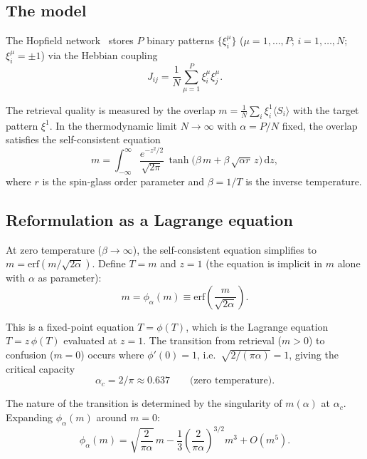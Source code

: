 \documentclass[11pt,a4paper]{article}
\theoremstyle{definition}
\newcommand{\dd}{\mathrm{d}}
\begin{document}
\subsection{The model}

The Hopfield network~\cite{hopfield1982} stores $P$ binary patterns
$\{\xi^{\mu}_i\}$ ($\mu = 1, \ldots, P$; $i = 1, \ldots, N$;
$\xi^{\mu}_i = \pm 1$) via the Hebbian coupling
\begin{equation}
J_{ij} = \frac{1}{N} \sum_{\mu=1}^{P} \xi^{\mu}_i \xi^{\mu}_j.
\end{equation}

The retrieval quality is measured by the overlap $m = \frac{1}{N}
\sum_i \xi^{1}_i \langle S_i \rangle$ with the target pattern $\xi^1$.
In the thermodynamic limit $N \to \infty$ with $\alpha = P/N$ fixed,
the overlap satisfies the self-consistent equation~\cite{amit1985}
\begin{equation}
m = \int_{-\infty}^{\infty} \frac{e^{-z^2/2}}{\sqrt{2\pi}}\,
\tanh\bigl(\beta\,m + \beta\,\sqrt{\alpha r}\,z\bigr)\,\dd z,
\label{eq:hopfield_sc}
\end{equation}
where $r$ is the spin-glass order parameter and $\beta = 1/T$ is the
inverse temperature.

\subsection{Reformulation as a Lagrange equation}

At zero temperature ($\beta \to \infty$), the self-consistent equation
simplifies to $m = \text{erf}(m / \sqrt{2\alpha})$. Define
$T = m$ and $z = 1$ (the equation is implicit in $m$ alone with
$\alpha$ as parameter):
\begin{equation}
m = \phi_\alpha(m) \equiv \text{erf}\!\left(\frac{m}{\sqrt{2\alpha}}\right).
\end{equation}

This is a fixed-point equation $T = \phi(T)$, which is the Lagrange
equation $T = z\,\phi(T)$ evaluated at $z = 1$. The transition from
retrieval ($m > 0$) to confusion ($m = 0$) occurs where $\phi'(0) = 1$,
i.e.\ $\sqrt{2/(\pi\alpha)} = 1$, giving the critical capacity
\begin{equation}
\alpha_c = 2/\pi \approx 0.637 \qquad \text{(zero temperature)}.
\end{equation}

The nature of the transition is determined by the singularity of
$m(\alpha)$ at $\alpha_c$. Expanding $\phi_\alpha(m)$ around $m = 0$:
\begin{equation}
\phi_\alpha(m) = \sqrt{\frac{2}{\pi\alpha}}\,m
- \frac{1}{3}\left(\frac{2}{\pi\alpha}\right)^{3/2} m^3 + O(m^5).
\end{equation}
\end{document}
